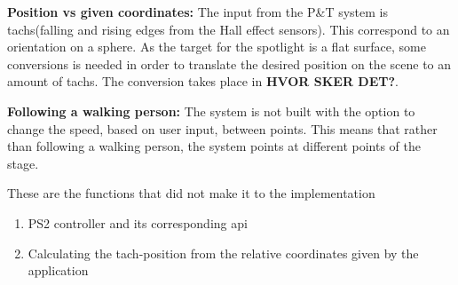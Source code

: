 \textbf{Position vs given coordinates:} The input from the P\&T system is tachs(falling and rising edges from the Hall effect sensors). This correspond to an orientation on a sphere. As the target for the spotlight is a flat surface, some conversions is needed in order to translate the desired position on the scene to an amount of tachs. The conversion takes place in \textbf{HVOR SKER DET?}.


\textbf{Following a walking person:} The system is not built with the option to change the speed, based on user input, between points. This means that rather than following a walking person, the system points at different points of the stage.


These are the functions that did not make it to the implementation

\begin{enumerate}[noitemsep]
	
	\item PS2 controller and its corresponding api
	
	\item Calculating the tach-position from the relative coordinates given by the application  
	
	

\end{enumerate}